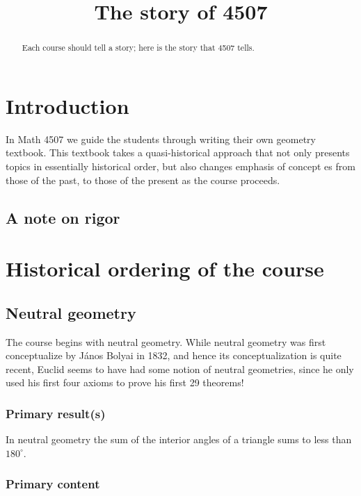 \documentclass{amsart}
\title{The story of 4507}
\begin{document}
\begin{abstract}
  Each course should tell a story; here is the story that 4507 tells.
\end{abstract}
\maketitle

\section{Introduction}

In Math 4507 we guide the students through writing their own geometry
textbook. This textbook takes a quasi-historical approach that not
only presents topics in essentially historical order, but also changes
emphasis of concept es from those of the past, to those of the present
as the course proceeds.

\subsection{A note on rigor}




\section{Historical ordering of the course}

\subsection{Neutral geometry}

The course begins with neutral geometry. While neutral geometry was
first conceptualize by J\'anos Bolyai in 1832, and hence its
conceptualization is quite recent, Euclid seems to have had some
notion of neutral geometries, since he only used his first four axioms
to prove his first 29 theorems!

\subsubsection{Primary result(s)}

In neutral geometry the sum of the interior angles of a triangle sums
to less than $180^\circ$.

\subsubsection{Primary content}
\end{document}
